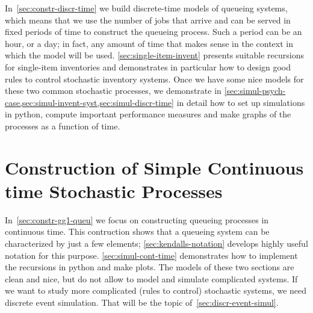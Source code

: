 In~\cref{sec:constr-discr-time} we build discrete-time models of queueing systems, which means that we use the number of jobs that arrive and can be served in fixed periods of time to construct the queueing process.
Such a period can be an hour, or a day; in fact, any amount of time that makes sense in the context in which the model will be used.
\cref{sec:single-item-invent} presents suitable recursions for single-item inventories and demonstrates in particular how to design good rules to control stochastic inventory systems.
Once we have some nice models for these two common stochastic processes, we demonstrate in \cref{sec:simul-psych-case,sec:simul-invent-syst,sec:simul-discr-time} in detail how to set up simulations in python, compute important performance measures and make graphs of the processes as a function of time.





%




\chapter{Construction of Simple Continuous time Stochastic Processes}
\label{cha:continuous-time}

In~\cref{sec:constr-gg1-queu} we focus on constructing queueing processes in continuous time.
This contruction shows that a queueing system can be characterized by just a few elements; \cref{sec:kendalls-notation} develops highly useful notation for this purpose.
\cref{sec:simul-cont-time} demonstrates how to implement the recursions in python and make plots.
The models of these two sections are clean and nice, but do not allow to model and simulate complicated systems.
If we want to study more complicated (rules to control) stochastic  systems, we need discrete event simulation.
That will be the topic of~\cref{sec:discr-event-simul}.



